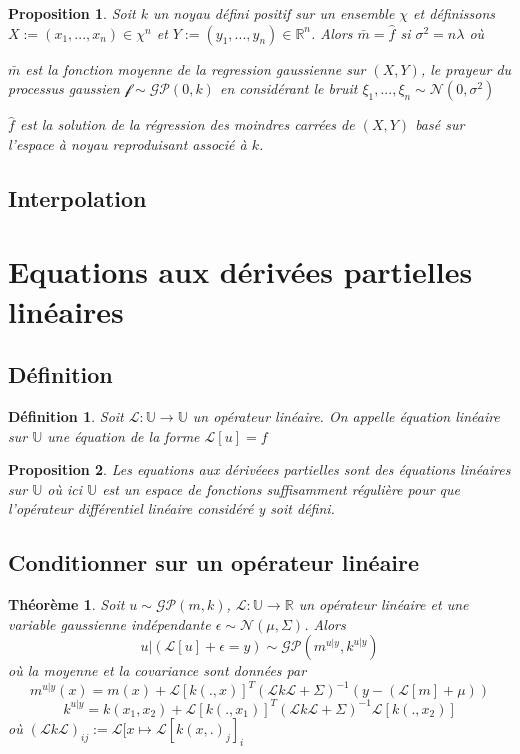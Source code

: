 \documentclass[a4paper,12pt]{article}
\newtheorem{definition}{Définition}
\newtheorem{proposition}{Proposition}
\newtheorem{theorem}{Théorème}
\begin{document}
\begin{proposition}
    Soit $k$ un noyau défini positif sur un ensemble $\chi$ et définissons $X:=(x_1,...,x_n)\in\chi^n$ et $Y:=(y_1,...,y_n)\in\mathbb{R}^n$. Alors $\bar{m}=\hat{f}$ si $\sigma^2=n\lambda$ où

$\bar{m}$ est la fonction moyenne de la regression gaussienne sur $(X,Y)$, le prayeur du processus gaussien $\mathcal{f}\sim\mathcal{GP}(0,k)$ en considérant le bruit $\xi_1,...,\xi_n\sim\mathcal{N}(0,\sigma^2)$

$\hat{f}$ est la solution de la régression des moindres carrées de $(X,Y)$ basé sur l'espace à noyau reproduisant associé à $k$.
\end{proposition}

\subsection{Interpolation}

\section{Equations aux dérivées partielles linéaires}

\subsection{Définition}

\begin{definition}
    Soit $\mathcal{L}:\mathbb{U}\to\mathbb{U}$ un opérateur linéaire.
    On appelle équation linéaire sur $\mathbb{U}$ une équation de la forme
    $\mathcal{L}[u] = f$
\end{definition}

\begin{proposition}
    Les equations aux dérivéees partielles sont des équations linéaires sur
    $\mathbb{U}$ où ici $\mathbb{U}$ est un espace de fonctions suffisamment
    régulière pour que l'opérateur différentiel linéaire considéré y soit 
    défini.
\end{proposition}

\subsection{Conditionner sur un opérateur linéaire}

\begin{theorem}
    Soit $u\sim\mathcal{GP}(m,k)$, $\mathcal{L}:\mathbb{U}\to\mathbb{R}$ un opérateur linéaire et une variable gaussienne indépendante $\epsilon \sim \mathcal{N}(\mu,\Sigma)$. Alors 
$$
u | (\mathcal{L}[u]+\epsilon=y)\sim\mathcal{GP}(m^{u|y},k^{u|y})
$$
où la moyenne et la covariance sont données par 
$$
m^{u|y}(x)=m(x)+\mathcal{L}[k(.,x)]^{T}(\mathcal{L}k\mathcal{L}+\Sigma)^{-1}(y-(\mathcal{L}[m]+\mu))
$$
$$
k^{u|y}=k(x_1,x_2)+\mathcal{L}[k(.,x_1)]^{T}(\mathcal{L}k\mathcal{L}+\Sigma)^{-1}\mathcal{L}[k(.,x_2)]
$$
où $(\mathcal{L}k\mathcal{L})_{ij}:=\mathcal{L}[x\mapsto\mathcal{L}[k(x,.)_j]_i$
\end{theorem}
\end{document}
